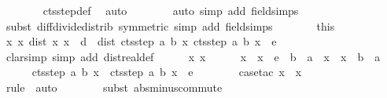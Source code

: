 \documentclass[leqno]{article}
\theoremstyle{definition}
\begin{document}
\begin{isabellebody}
\ \ \ \ \ \ \isamarkupfalse%
\ cts{\isacharunderscore}step{\isacharunderscore}def\ \isamarkupfalse%
\ auto\isanewline
\ \ \ \ \ \ \isamarkupfalse%
\ {\isacharparenleft}auto\ simp\ add{\isacharcolon}\ field{\isacharunderscore}simps{\isacharparenright}{\isacharbrackleft}{}{\isacharbrackright}\isanewline
\ \ \ \ \ \ \isamarkupfalse%
\ {\isacharparenleft}subst\ diff{\isacharunderscore}divide{\isacharunderscore}distrib\ {\isacharbrackleft}symmetric{\isacharbrackright}{\isacharcomma}\ simp\ add{\isacharcolon}\ field{\isacharunderscore}simps{\isacharparenright}\isanewline
\ \ \isacommand{{\isacharbraceright}}\isamarkupfalse%
\ \isamarkupfalse%
\ {\isacharasterisk}\ {\isacharequal}\ this\isanewline
\ \ \isamarkupfalse%
\ {\isachardoublequoteopen}{\isasymforall}x\ x{\isacharprime}{\isachardot}\ dist\ x{\isacharprime}\ x\ {\isacharless}\ {\isacharquery}d\ {\isasymlongrightarrow}\ dist\ {\isacharparenleft}cts{\isacharunderscore}step\ a\ b\ x{\isacharprime}{\isacharparenright}\ {\isacharparenleft}cts{\isacharunderscore}step\ a\ b\ x{\isacharparenright}\ {\isacharless}\ e{\isachardoublequoteclose}\isanewline
\ \ \isamarkupfalse%
\ {\isacharparenleft}clarsimp\ simp\ add{\isacharcolon}\ dist{\isacharunderscore}real{\isacharunderscore}def{\isacharparenright}\isanewline
\ \ \ \ \isamarkupfalse%
\ x\ x{\isacharprime}\isanewline
\ \ \ \ \isamarkupfalse%
\ {\isachardoublequoteopen}{\isasymbar}x{\isacharprime}\ {\isacharminus}\ x{\isasymbar}\ {\isacharless}\ e\ {\isacharasterisk}\ {\isacharparenleft}b\ {\isacharminus}\ a{\isacharparenright}{\isachardoublequoteclose}\ \ {\isachardoublequoteopen}{\isasymbar}x{\isacharprime}\ {\isacharminus}\ x{\isasymbar}\ {\isacharless}\ b\ {\isacharminus}\ a{\isachardoublequoteclose}\ \isanewline
\ \ \ \ \isamarkupfalse%
\ {\isachardoublequoteopen}{\isasymbar}cts{\isacharunderscore}step\ a\ b\ x{\isacharprime}\ {\isacharminus}\ cts{\isacharunderscore}step\ a\ b\ x{\isasymbar}\ {\isacharless}\ e{\isachardoublequoteclose}\isanewline
\ \ \ \ \ \ \isamarkupfalse%
\ {\isacharparenleft}case{\isacharunderscore}tac\ {\isachardoublequoteopen}x\ {\isasymle}\ x{\isacharprime}{\isachardoublequoteclose}{\isacharparenright}\isanewline
\ \ \ \ \ \ \isamarkupfalse%
\ {\isacharparenleft}rule\ {\isacharasterisk}{\isacharcomma}\ auto{\isacharparenright}\isanewline
\ \ \ \ \ \ \isamarkupfalse%
\ {\isacharparenleft}subst\ abs{\isacharunderscore}minus{\isacharunderscore}commute{\isacharparenright}\isanewline

\end{isabellebody}
\end{document}
